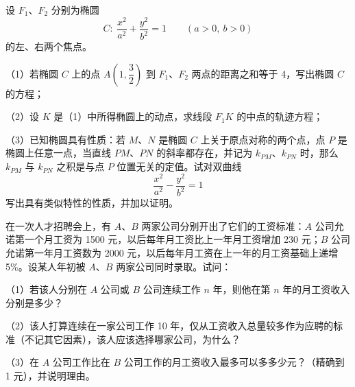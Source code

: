 \begin{question}
设 $F_1$、$F_2$ 分别为椭圆
\nopagebreak[4]
\[
C:\ \dfrac{x^2}{a^2}+\dfrac{y^2}{b^2}=1\qquad(a>0,\ b>0)
\]
的左、右两个焦点。

（1）若椭圆 $C$ 上的点 $A\left(1,\dfrac32\right)$ 到 $F_1$、$F_2$ 两点的距离之和等于 4，写出椭圆 $C$ 的方程；

（2）设 $K$ 是（1）中所得椭圆上的动点，求线段 $F_1K$ 的中点的轨迹方程；

（3）已知椭圆具有性质：若 $M$、$N$ 是椭圆 $C$ 上关于原点对称的两个点，点 $P$ 是椭圆上任意一点，当直线 $PM$、$PN$ 的斜率都存在，并记为 $k_{PM}$、$k_{PN}$ 时，那么 $k_{PM}$ 与 $k_{PN}$ 之积是与点 $P$ 位置无关的定值。试对双曲线
\nopagebreak[4]
\[
\dfrac{x^2}{a^2}-\dfrac{y^2}{b^2}=1
\]
写出具有类似特性的性质，并加以证明。

\end{question}
\begin{question}
在一次人才招聘会上，有 $A$、$B$ 两家公司分别开出了它们的工资标准：$A$ 公司允诺第一个月工资为 1500 元，以后每年月工资比上一年月工资增加 230 元；$B$ 公司允诺第一年月工资数为 2000 元，以后每年月工资在上一年的月工资基础上递增 5\%。设某人年初被 $A$、$B$ 两家公司同时录取。试问：

（1）若该人分别在 $A$ 公司或 $B$ 公司连续工作 $n$ 年，则他在第 $n$ 年的月工资收入分别是多少？

（2）该人打算连续在一家公司工作 10 年，仅从工资收入总量较多作为应聘的标准（不记其它因素），该人应该选择哪家公司，为什么？

（3）在 $A$ 公司工作比在 $B$ 公司工作的月工资收入最多可以多多少元？（精确到 1 元），并说明理由。

\end{question}